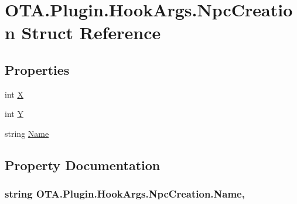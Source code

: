 \hypertarget{struct_o_t_a_1_1_plugin_1_1_hook_args_1_1_npc_creation}{}\section{O\+T\+A.\+Plugin.\+Hook\+Args.\+Npc\+Creation Struct Reference}
\label{struct_o_t_a_1_1_plugin_1_1_hook_args_1_1_npc_creation}
\subsection*{Properties}
\begin{DoxyCompactItemize}
\item 
int \hyperlink{struct_o_t_a_1_1_plugin_1_1_hook_args_1_1_npc_creation_a7b068d20547471d864bea46f89b63e70}{X}
\item 
int \hyperlink{struct_o_t_a_1_1_plugin_1_1_hook_args_1_1_npc_creation_a8fe80f76a990c03c5954003578bd4462}{Y}
\item 
string \hyperlink{struct_o_t_a_1_1_plugin_1_1_hook_args_1_1_npc_creation_af229275c71990d1773a56703d8b576bd}{Name}
\end{DoxyCompactItemize}


\subsection{Property Documentation}
\hypertarget{struct_o_t_a_1_1_plugin_1_1_hook_args_1_1_npc_creation_af229275c71990d1773a56703d8b576bd}{}
\subsubsection[{Name}]{\setlength{\rightskip}{0pt plus 5cm}string O\+T\+A.\+Plugin.\+Hook\+Args.\+Npc\+Creation.\+Name\hspace{0.3cm}{\ttfamily [get]}, {\ttfamily [set]}}\label{struct_o_t_a_1_1_plugin_1_1_hook_args_1_1_npc_creation_af229275c71990d1773a56703d8b576bd}
\hypertarget{struct_o_t_a_1_1_plugin_1_1_hook_args_1_1_npc_creation_a7b068d20547471d864bea46f89b63e70}{}
